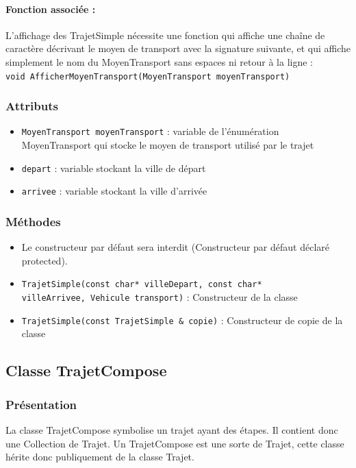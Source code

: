 \documentclass[10pt,a4paper,twoside]{article}
\begin{document}
\paragraph{Fonction associée :} 
L'affichage des TrajetSimple nécessite une fonction qui affiche une chaîne de caractère décrivant le moyen de transport avec la signature suivante, et qui affiche simplement le nom du MoyenTransport sans espaces ni retour à la ligne :\\
\verb=void AfficherMoyenTransport(MoyenTransport moyenTransport)=

\subsubsection{Attributs}
\begin{itemize}
\item \verb=MoyenTransport moyenTransport= : variable de l'énumération MoyenTransport qui stocke le moyen de transport utilisé par le trajet
\item \verb=depart= : variable stockant la ville de départ
\item \verb=arrivee= : variable stockant la ville d'arrivée
\end{itemize}
\subsubsection{Méthodes}
\begin{itemize}
\item Le constructeur par défaut sera interdit (Constructeur par défaut déclaré protected).
\item \verb=TrajetSimple(const char* villeDepart, const char* =\\
\verb=villeArrivee, Vehicule transport)= : Constructeur de la classe
\item \verb=TrajetSimple(const TrajetSimple & copie)= : Constructeur de copie de la classe

\end{itemize}

\subsection{Classe TrajetCompose}
\subsubsection{Présentation}
La classe TrajetCompose symbolise un trajet ayant des étapes. Il contient donc une Collection de Trajet. Un TrajetCompose est une sorte de Trajet, cette classe hérite donc publiquement de la classe Trajet.
\end{document}
